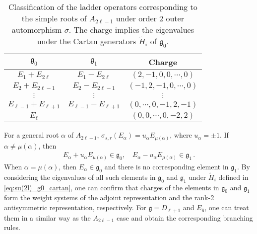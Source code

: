 \begin{table}
	\centering
	\begin{tabular}{ccc}
		$\mathfrak{g}_0$ & $\mathfrak{g}_1$ & Charge \\ \hline
		$E_1 + E_{2\ell}$ & $E_1 - E_{2\ell}$ & $(2, -1, 0, 0, \cdots, 0)$ \\
		$E_2 + E_{2\ell-1}$ & $E_2 - E_{2\ell-1}$ & $(-1, 2, -1, 0, \cdots, 0)$ \\
		$\vdots$ & $\vdots$ & $\vdots$ \\
		$E_{\ell-1} + E_{\ell+1}$ & $E_{\ell-1} - E_{\ell+1}$ & $(0, \cdots, 0, -1, 2, -1)$ \\
		$E_\ell$ & & $(0, 0, \cdots, 0, -2, 2)$
	\end{tabular}
	\caption{Classification of the ladder operators corresponding to the simple roots of $ A_{2\ell-1} $ under order 2 outer automorphism $ \sigma $. The charge implies the eigenvalues under the Cartan generators $ \tilde{H}_i $ of $ \mathfrak{g}_0 $.} \label{table:A_2l-1_root_class}
\end{table}
For a general root $ \alpha $ of $ A_{2\ell-1} $, $ \sigma_{s,r}(E_\alpha) = u_\alpha E_{\mu(\alpha)} $, where $ u_\alpha = \pm 1 $. If $ \alpha \neq \mu(\alpha) $, then
\begin{align}
E_\alpha + u_\alpha E_{\mu(\alpha)} \in \mathfrak{g}_0, \quad
E_\alpha - u_\alpha E_{\mu(\alpha)} \in \mathfrak{g}_1 \, .
\end{align}
When $ \alpha = \mu(\alpha) $, then $ E_\alpha \in \mathfrak{g}_0 $ and there is no corresponding element in $ \mathfrak{g}_1 $. By considering the eigenvalues of all such elements in $ \mathfrak{g}_0 $ and $ \mathfrak{g}_1 $ under $ \tilde{H}_i $ defined in \eqref{eq:su(2l)_g0_cartan}, one can confirm that charges of the elements in $ \mathfrak{g}_0 $ and $ \mathfrak{g}_1 $ form the weight systems of the adjoint representation and the rank-2 antisymmetric representation, respectively. For $ \mathfrak{g} = D_{\ell+1}$ and $E_6 $, one can treat them in a similar way as the $ A_{2\ell-1} $ case and obtain the corresponding branching rules.

